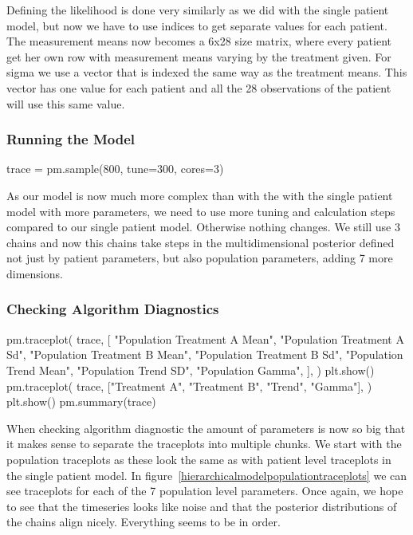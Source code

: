 \documentclass[12pt,a4paper,leqno]{report}
\theoremstyle{plain}
\theoremstyle{definition}
\theoremstyle{remark}
\begin{document}
Defining the likelihood is done very similarly as we did with the single patient model,
but now we have to use indices to get separate values for each patient. The measurement
means now becomes a 6x28 size matrix, where every patient get her own row with
measurement means varying by the treatment given. For sigma we use a vector that is
indexed the same way as the treatment means. This vector has one value for each patient
and all the 28 observations of the patient will use this same value.


\subsubsection{Running the Model}

\bigskip
\begin{pyverbatim}
    trace = pm.sample(800, tune=300, cores=3)
\end{pyverbatim}
\bigskip

As our model is now much more complex than with the with the single patient model with
more parameters, we need to use more tuning and calculation steps compared to our single
patient model. Otherwise nothing changes. We still use 3 chains and now this chains take
steps in the multidimensional posterior defined not just by patient parameters, but also
population parameters, adding 7 more dimensions.

\subsubsection{Checking Algorithm Diagnostics}

\bigskip
\begin{pyverbatim}
    pm.traceplot(
        trace,
        [
            "Population Treatment A Mean",
            "Population Treatment A Sd",
            "Population Treatment B Mean",
            "Population Treatment B Sd",
            "Population Trend Mean",
            "Population Trend SD",
            "Population Gamma",
        ],
    )
    plt.show()
    pm.traceplot(
        trace, ["Treatment A", "Treatment B", "Trend", "Gamma"],
    )
    plt.show()
    pm.summary(trace)
\end{pyverbatim}
\bigskip

When checking algorithm diagnostic the amount of parameters is now so big that it makes
sense to separate the traceplots into multiple chunks. We start with the population
traceplots as these look the same as with patient level traceplots in the single patient
model. In figure\ \ref{hierarchicalmodelpopulationtraceplots} we can see traceplots for each of
the 7 population level parameters. Once again, we hope to see that the timeseries looks
like noise and that the posterior distributions of the chains align nicely. Everything
seems to be in order.
\end{document}
